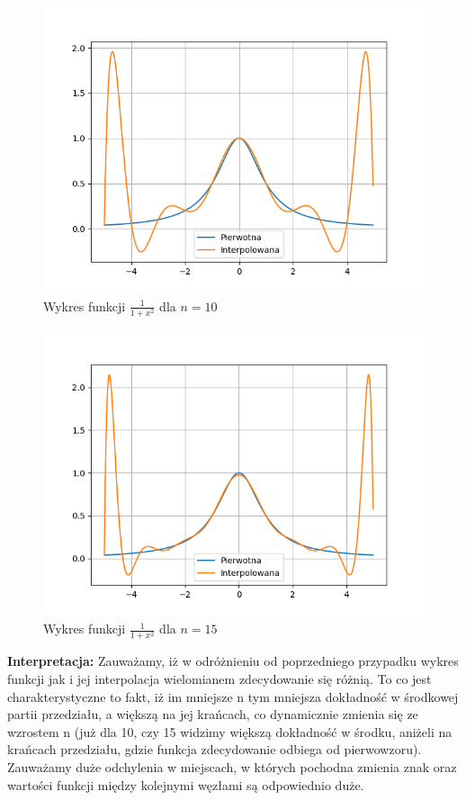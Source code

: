 \documentclass[a4paper,14pt]{report}
\begin{document}
    \begin{figure}[H]
      \includegraphics[scale=0.75]{d-10}
      \centering
      \caption{Wykres funkcji $\frac{1}{1+x^{2}}$ dla $n=10$}
    \end{figure}
    \begin{figure}[H]
      \includegraphics[scale=0.75]{d-15}
      \centering
      \caption{Wykres funkcji $\frac{1}{1+x^{2}}$ dla $n=15$}
    \end{figure}
    \textbf{Interpretacja: } Zauważamy, iż w odróżnieniu od poprzedniego przypadku wykres funkcji jak i jej interpolacja wielomianem zdecydowanie się różnią. To co jest charakterystyczne to fakt, iż im mniejsze n tym mniejsza  dokładność w środkowej partii przedziału, a większą na jej krańcach, co dynamicznie zmienia się ze wzrostem n (już dla 10, czy 15 widzimy większą dokładność w środku, aniżeli na krańcach przedziału, gdzie funkcja zdecydowanie odbiega od pierwowzoru). Zauważamy duże odchylenia w miejscach, w których pochodna zmienia znak oraz wartości funkcji między kolejnymi węzłami są odpowiednio duże.
\end{document}
